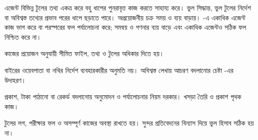 এজেন্ট বিভিন্ন টুলের তথ্য একত্র করে বহু ধাপের পুনরাবৃত্ত কাজ করতে সাহায্য করে। ভুল সিদ্ধান্ত, ভুল টুলের নির্দেশ বা অবিশ্বস্ত তথ্যের প্রভাব পরের ধাপে ছড়াতে পারে। অপ্রয়োজনীয় চক্র সময় ও ব্যয় বাড়ায়। -এ একাধিক এজেন্ট কাজ ভাগ করে বা পরস্পরের ফল পর্যালোচনা করে; সমন্বয় ও গণনার ব্যয় বাড়ে এবং একাধিক এজেন্টও সঠিক ফল নিশ্চিত করে না।
\begin{compactpoints}
\item কাজের প্রয়োজন অনুযায়ী সীমিত ফাইল, তথ্য ও টুলের অধিকার দিতে হয়।
\item বাইরের ওয়েবপাতা বা নথির নির্দেশ ব্যবহারকারীর অনুমতি নয়। অবিশ্বস্ত লেখায় আচরণ বদলানোর চেষ্টা -এর উদাহরণ।
\item প্রকাশ, টাকা পাঠানো বা রেকর্ড বদলানোয় অনুমোদন ও পর্যালোচনার নিয়ম দরকার। খসড়া তৈরি ও প্রকাশ পৃথক কাজ।
\item টুলের লগ, পরীক্ষার ফল ও অসম্পূর্ণ কাজের অবস্থা রাখতে হয়। সুন্দর প্রতিবেদনের বিন্যাস দিয়ে ভুল হিসাব সঠিক হয় না।
\end{compactpoints}
